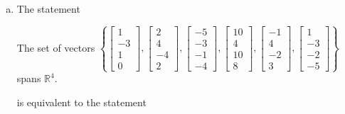 \begin{exerciseAnswer}
\begin{enumerate}[(a)]
\item The statement 
\begin{center}\begin{minipage}{0.8\textwidth}
 The set of vectors \( \left\{ \left[\begin{array}{c}
1 \\
-3 \\
1 \\
0
\end{array}\right] , \left[\begin{array}{c}
2 \\
4 \\
-4 \\
2
\end{array}\right] , \left[\begin{array}{c}
-5 \\
-3 \\
-1 \\
-4
\end{array}\right] , \left[\begin{array}{c}
10 \\
4 \\
10 \\
8
\end{array}\right] , \left[\begin{array}{c}
-1 \\
4 \\
-2 \\
3
\end{array}\right] , \left[\begin{array}{c}
1 \\
-3 \\
-2 \\
-5
\end{array}\right] \right\} \) spans \(\mathbb{R}^4\). 
\end{minipage}\end{center}
     is equivalent to the statement 
\begin{center}\begin{minipage}{0.8\textwidth}
 The vector equation \( x_{1} \left[\begin{array}{c}
1 \\
-3 \\
1 \\
0
\end{array}\right] + x_{2} \left[\begin{array}{c}
2 \\
4 \\

\end{array}
\end{minipage}
\end{center}
\end{enumerate}
\end{exerciseAnswer}
